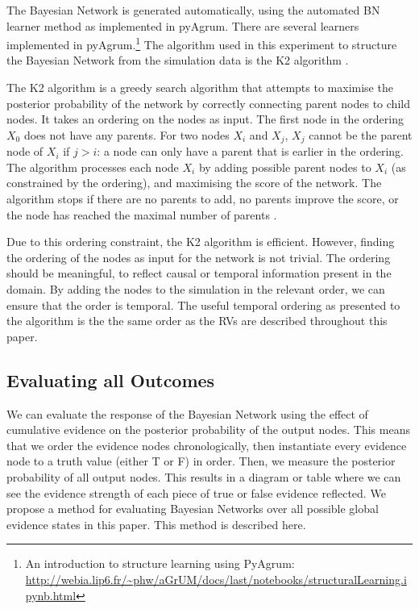 \documentclass[11pt]{article}
\begin{document}
The Bayesian Network is generated automatically, using the automated BN learner method as implemented in pyAgrum. There are several learners implemented in pyAgrum.\footnote{An introduction to structure learning using PyAgrum: \url{http://webia.lip6.fr/~phw/aGrUM/docs/last/notebooks/structuralLearning.ipynb.html}} The algorithm used in this experiment to structure the Bayesian Network from the simulation data is the K2 algorithm \citep{Cooper1992}. 

The K2 algorithm is a greedy search algorithm that attempts to maximise the posterior probability of the network by correctly connecting parent nodes to child nodes. It takes an ordering on the nodes as input. The first node in the ordering $X_0$ does not have any parents. For two nodes $X_i$ and $X_j$, $X_j$ cannot be the parent node of $X_i$ if $j > i$: a node can only have a parent that is earlier in the ordering. The algorithm processes each node $X_i$ by adding possible parent nodes to $X_i$ (as constrained by the ordering), and maximising the score of the network. The algorithm stops if there are no parents to add, no parents improve the score, or the node has reached the maximal number of parents \citep{Chen2008}.

Due to this ordering constraint, the K2 algorithm is efficient. However, finding the ordering of the nodes as input for the network is not trivial. The ordering should be meaningful, to reflect causal or temporal information present in the domain. By adding the nodes to the simulation in the relevant order, we can ensure that the order is temporal. The useful temporal ordering as presented to the algorithm is the the same order as the RVs are described throughout this paper. 



\subsection{Evaluating all Outcomes}

We can evaluate the response of the Bayesian Network using the effect of cumulative evidence on the posterior probability of the output nodes. This means that we order the evidence nodes chronologically, then instantiate every evidence node to a truth value (either T or F) in order. Then, we measure the posterior probability of all output nodes. This results in a diagram or table where we can see the evidence strength of each piece of true or false evidence reflected. We propose a method for evaluating Bayesian Networks over all possible global evidence states in this paper. This method is described here.
\end{document}
